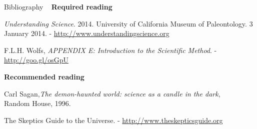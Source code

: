 \documentclass[t]{beamer}
\begin{document}

\begin{ftst}
{Bibliography}
{\ }
\scriptsize
\textbf{Required reading}

\benums \textit{Understanding Science}. 2014. University of California Museum of Paleontology. 3 January 2014. - 
{\tiny \url{http://www.understandingscience.org}}
	\item F.L.H. Wolfs, \textit{APPENDIX E: Introduction to the Scientific Method}. - 
	{\tiny \url{http://goo.gl/osGpU}}
\eenum

\textbf{Recommended reading}

\benums Carl Sagan,\textit{The demon-haunted world: science as a candle in the dark},\\Random House, 1996.
	\item The Skeptics Guide to the Universe. - 
	{\tiny \url{http://www.theskepticsguide.org}}
\eenum
\end{ftst}



\end{document}
